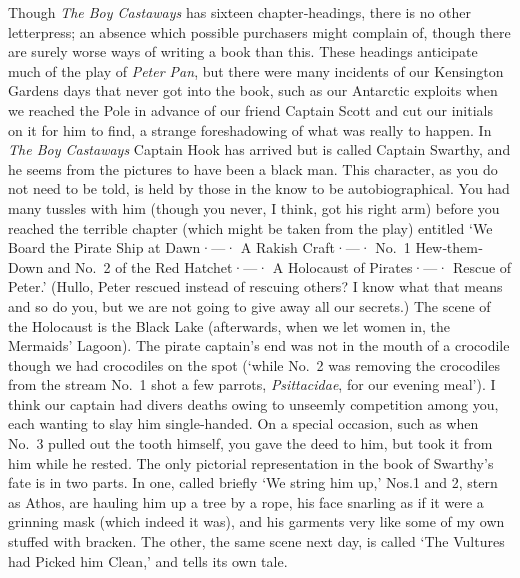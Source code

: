 Though \emph{The Boy Castaways} has sixteen chapter‐headings,
there is no other letterpress;
an absence which possible purchasers might complain of,
though there are surely worse ways of writing a book than this.
These headings anticipate much of the play of \emph{Peter Pan},
but there were many incidents of our Kensington Gardens days that never got into the book,
such as our Antarctic exploits
when we reached the Pole in advance of our friend Captain Scott
and cut our initials on it for him to find,
a strange foreshadowing of what was really to happen.
In \emph{The Boy Castaways} Captain Hook has arrived but is called Captain Swarthy,
and he seems from the pictures to have been a black man.
This character, as you do not need to be told,
is held by those in the know to be autobiographical.
You had many tussles with him
(though you never, I think, got his right arm)
before you reached the terrible chapter
(which might be taken from the play)
entitled ‘We Board the Pirate Ship at Dawn·—·%
A Rakish Craft·—·%
No.~1 Hew‐them‐Down and No.~2 of the Red Hatchet·—·%
A Holocaust of Pirates·—·%
Rescue of Peter.’
(Hullo, Peter rescued instead of rescuing others?
I know what that means and so do you, but we are not going to give away all our secrets.)
The scene of the Holocaust is the Black Lake
(afterwards, when we let women in, the Mermaids’ Lagoon).
The pirate captain’s end was not in the mouth of a crocodile though we had crocodiles on the spot
(‘while No.~2 was removing the crocodiles from the stream
No.~1 shot a few parrots, \emph{Psittacidae}, for our evening meal’).
I think our captain had divers deaths owing to unseemly competition among you,
each wanting to slay him single‐handed.
On a special occasion, such as when No.~3 pulled out the tooth himself,
you gave the deed to him, but took it from him while he rested.
The only pictorial representation in the book of Swarthy’s fate is in two parts.
In one, called briefly ‘We string him up,’
Nos.\@ 1 and 2, stern as Athos, are hauling him up a tree by a rope,
his face snarling as if it were a grinning mask (which indeed it was),
and his garments very like some of my own stuffed with bracken.
The other, the same scene next day, is called ‘The Vultures had Picked him Clean,’
and tells its own tale.

